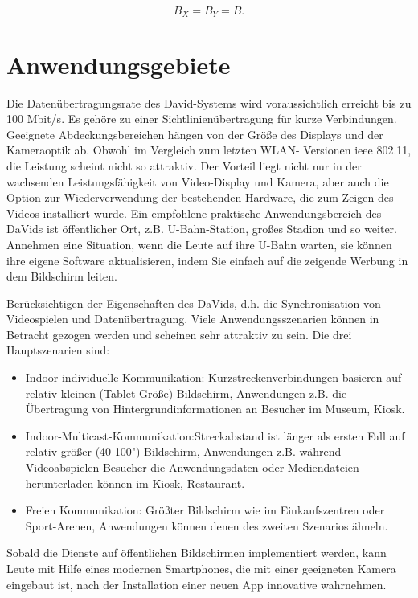 \begin{equation}
   B_X = B_Y = B.
\end{equation}





\section{Anwendungsgebiete} 

Die Datenübertragungsrate des David-Systems wird voraussichtlich erreicht bis zu 100 Mbit/s. Es gehöre	zu einer Sichtlinienübertragung für kurze Verbindungen. Geeignete Abdeckungsbereichen hängen von der Größe des Displays und der Kameraoptik ab. Obwohl im Vergleich zum letzten WLAN- Versionen \gls{ieee} 802.11, die Leistung scheint nicht so attraktiv. Der Vorteil liegt nicht nur in der wachsenden Leistungsfähigkeit von Video-Display und Kamera, aber auch die Option zur Wiederverwendung der bestehenden Hardware, die zum Zeigen des Videos installiert wurde. Ein empfohlene praktische Anwendungsbereich des DaVids ist öffentlicher Ort, z.B. U-Bahn-Station, großes Stadion und so weiter. Annehmen eine Situation, wenn die Leute auf ihre U-Bahn warten, sie können ihre eigene Software aktualisieren, indem Sie einfach auf die zeigende Werbung in dem Bildschirm leiten.

Berücksichtigen der Eigenschaften des DaVids, d.h. die Synchronisation von Videospielen und Datenübertragung. Viele Anwendungsszenarien können in Betracht gezogen werden und scheinen sehr attraktiv zu sein. Die drei Hauptszenarien sind:

\begin{itemize}
  \item Indoor-individuelle Kommunikation: Kurzstreckenverbindungen basieren auf relativ kleinen (Tablet-Größe) Bildschirm, Anwendungen z.B. die Übertragung von Hintergrundinformationen an Besucher im Museum, Kiosk.
  \item Indoor-Multicast-Kommunikation:Streckabstand ist länger als ersten Fall auf relativ größer (40-100") Bildschirm, Anwendungen z.B. während Videoabspielen Besucher die Anwendungsdaten oder Mediendateien herunterladen können im Kiosk, Restaurant.
  \item Freien Kommunikation: Größter Bildschirm wie im Einkaufszentren oder Sport-Arenen, Anwendungen können denen des zweiten Szenarios ähneln.
\end{itemize}

Sobald die Dienste auf öffentlichen Bildschirmen implementiert werden, kann Leute mit Hilfe eines modernen Smartphones, die mit einer geeigneten Kamera eingebaut ist, nach der Installation einer neuen App innovative wahrnehmen.





















